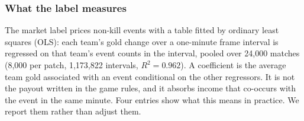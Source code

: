 \subsubsection{What the label measures}

The market label prices non-kill events with a table fitted by ordinary least squares (OLS):
each team's gold change over a one-minute frame interval is regressed on that team's event
counts in the interval, pooled over 24,000 matches (8,000 per patch, 1,173,822 intervals,
$R^2 = 0.962$).
A coefficient is the average team gold associated with an event conditional on the other
regressors. It is not the payout written in the game rules, and it absorbs income that
co-occurs with the event in the same minute.
Four entries show what this means in practice. We report them rather than adjust them.
